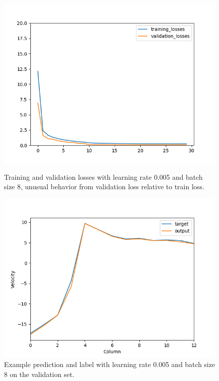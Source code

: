 \documentclass[10pt,conference]{IEEEtran}
\begin{document}
\begin{figure}[h]
  \centering
  \begin{minipage}[h]{0.23\textwidth}
    \includegraphics[width=\textwidth]{images/validation.png}
    \caption{Training and validation losses with learning rate 0.005 and batch size 8, unusual behavior from validation loss relative to train loss.}
    \label{figure:validation}
  \end{minipage}
  \hfill
  \begin{minipage}[h]{0.23\textwidth}
    \includegraphics[width=\textwidth]{images/predictions.png}
    \caption{Example prediction and label with learning rate 0.005 and batch size 8 on the validation set.}
    \label{figure:predictions}
  \end{minipage}
\end{figure}
\end{document}
